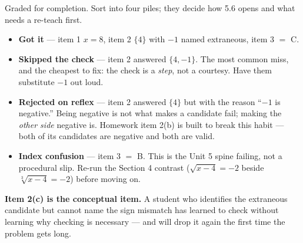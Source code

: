 \documentclass[10pt]{article}
\begin{document}
\begin{teachernote}
\small Graded for completion. Sort into four piles; they decide how 5.6 opens and what needs a
re-teach first.
\begin{itemize}[leftmargin=1.3em, nosep]
  \item \textbf{Got it} --- item 1 $x=8$, item 2 $\{4\}$ with $-1$ named extraneous, item 3 $=$ C.
  \item \textbf{Skipped the check} --- item 2 answered $\{4,-1\}$. The most common miss, and the
        cheapest to fix: the check is a \emph{step}, not a courtesy. Have them substitute $-1$ out
        loud.
  \item \textbf{Rejected on reflex} --- item 2 answered $\{4\}$ but with the reason ``$-1$ is
        negative.'' Being negative is not what makes a candidate fail; making the \emph{other side}
        negative is. Homework item 2(b) is built to break this habit --- both of its candidates are
        negative and both are valid.
  \item \textbf{Index confusion} --- item 3 $=$ B. This is the Unit 5 spine failing, not a
        procedural slip. Re-run the Section 4 contrast ($\sqrt{x-4}=-2$ beside
        $\sqrt[3]{x-4}=-2$) before moving on.
  \end{itemize}
\textbf{Item 2(c) is the conceptual item.} A student who identifies the extraneous candidate but
cannot name the sign mismatch has learned to check without learning why checking is necessary --- and
will drop it again the first time the problem gets long.
\end{teachernote}
\end{document}
